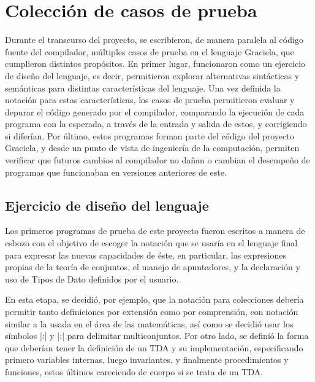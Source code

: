{{%
\section{Colección de casos de prueba}

Durante el transcurso del proyecto, se escribieron, de manera paralela al código
fuente del compilador, múltiples casos de prueba en el lenguaje Graciela, 
que cumplieron distintos propósitos. En primer lugar, funcionaron como un 
ejercicio de diseño del lenguaje, es decir, permitieron explorar alternativas 
sintácticas y semánticas para distintas características del lenguaje. Una vez
definida la notación para estas características, los casos de prueba 
permitieron evaluar y depurar el código generado por el compilador, comparando 
la ejecución de cada programa con la esperada, a través de la entrada y salida 
de estos, y corrigiendo si diferían. Por último, estos programas forman parte 
del código del proyecto Graciela, y desde un punto de vista de ingeniería de 
la computación, permiten verificar que futuros cambios al compilador no dañan 
o cambian el desempeño de programas que funcionaban en versiones anteriores de 
este.

\subsection{Ejercicio de diseño del lenguaje}

Los primeros programas de prueba de este proyecto fueron escritos a manera 
de esbozo con el objetivo de escoger la notación que se usaría en el lenguaje 
final para expresar las nuevas capacidades de éste, en particular, las 
expresiones propias de la teoría de conjuntos, el manejo de apuntadores, y la
declaración y uso de Tipos de Dato definidos por el usuario.

En esta etapa, se decidió, por ejemplo, que la notación para colecciones debería
permitir tanto definiciones por extensión como por comprensión, con notación 
similar a la usada en el área de las matemáticas, así como se decidió usar los 
símbolos \ingra|{:| y \ingra|:}| para delimitar multiconjuntos. Por otro lado,
se definió la forma que deberían tener la definición de un TDA y su 
implementación, especificando primero variables internas, luego invariantes, y 
finalmente procedimientos y funciones, estos últimos careciendo de cuerpo si se
trata de un TDA.

}}
